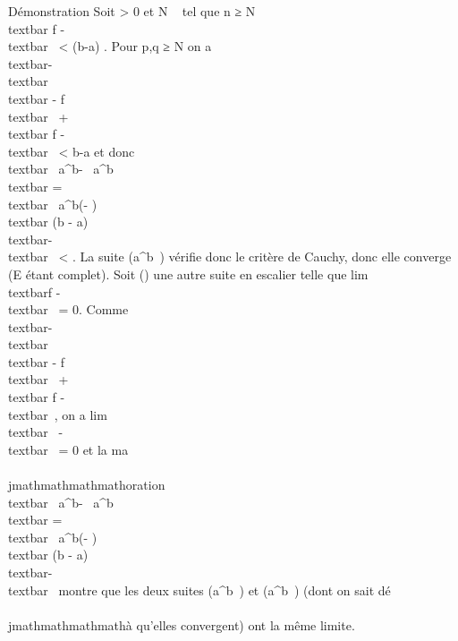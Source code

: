 Démonstration Soit \epsilon \textgreater{} 0 et N \in {}~ tel que n ≥ N
\rigtharrow~\\textbar{} f - \phin\\textbar{}\infty~
\textless{} \epsilon {}(b-a) . Pour p,q ≥ N on a
\\textbar{}\phip -
\phiq\\textbar{}\infty~ \leq\\textbar{}
\phip - f\\textbar{}\infty~ +\\textbar{}
f - \phiq\\textbar{}\infty~ \textless{} \epsilon
\over b-a et donc
\\textbar{}\int ~
a^b\phip -\int ~
a^b\phiq\\textbar{}
=\\textbar{}\int ~
a^b(\phip -
\phiq)\\textbar{} \leq (b -
a)\\textbar{}\phip -
\phiq\\textbar{}\infty~ \textless{} \epsilon. La suite
(\int  a^b\phin~) vérifie
donc le critère de Cauchy, donc elle converge (E étant complet). Soit
(\psin) une autre suite en escalier telle que
lim~\\textbar{}f -
\psin\\textbar{}\infty~ = 0. Comme
\\textbar{}\phin -
\psin\\textbar{}\infty~ \leq\\textbar{}
\phin - f\\textbar{}\infty~ +\\textbar{}
f - \psin\\textbar{}\infty~, on a
lim\\textbar{}\phin~ -
\psin\\textbar{}\infty~ = 0 et la ma\\\\jmathmathmathmathoration
\\textbar{}\int ~
a^b\phin -\int ~
a^b\psin\\textbar{}
=\\textbar{}\int ~
a^b(\phin -
\psin)\\textbar{} \leq (b -
a)\\textbar{}\phin -
\psin\\textbar{}\infty~ montre que les deux suites
(\int  a^b\phin~) et
(\int  a^b\psin~) (dont on
sait dé\\\\jmathmathmathmathà qu'elles convergent) ont la même limite.

